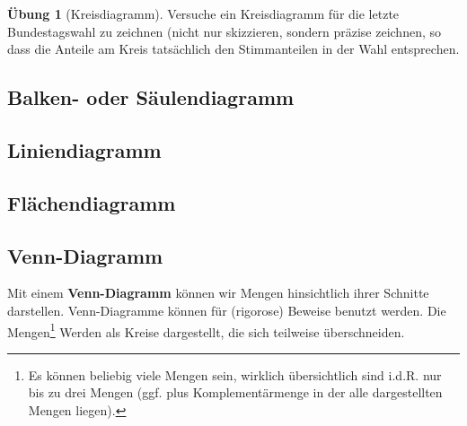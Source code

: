 \documentclass[a4paper]{book}%
\theoremstyle{definition}
\newtheorem{uebung}{Übung}
\begin{document}
\begin{uebung}[Kreisdiagramm]
    Versuche ein Kreisdiagramm für die letzte Bundestagswahl zu zeichnen (nicht nur skizzieren, sondern präzise zeichnen, so dass die Anteile am Kreis tatsächlich den Stimmanteilen in der Wahl entsprechen.
\end{uebung}

\subsection{Balken- oder Säulendiagramm}

\subsection{Liniendiagramm}

\subsection{Flächendiagramm}


\subsection{Venn-Diagramm}

Mit einem \textbf{Venn-Diagramm} können wir Mengen hinsichtlich ihrer Schnitte darstellen. Venn-Diagramme können für (rigorose) Beweise benutzt werden. Die Mengen\footnote{Es können beliebig viele Mengen sein, wirklich übersichtlich sind i.d.R. nur bis zu drei Mengen (ggf. plus Komplementärmenge in der alle dargestellten Mengen liegen).} Werden als Kreise dargestellt, die sich teilweise überschneiden.
\end{document}
